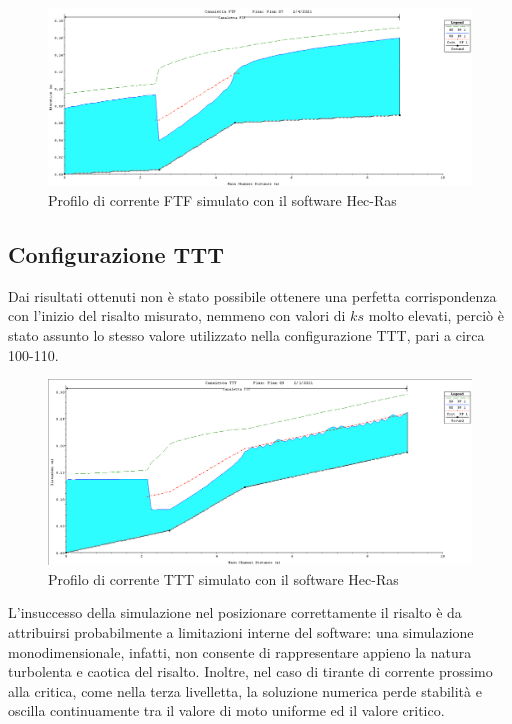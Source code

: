 \documentclass[12pt]{article} %
\begin{document}
\begin{figure}[H]
    \centering
    \includegraphics[scale=0.3]{Profilo HEC-RAS FTF.png}
    \caption{Profilo di corrente FTF simulato con il software Hec-Ras}
\end{figure}


\subsection{Configurazione TTT}

\noindent  Dai risultati ottenuti non è stato possibile ottenere una perfetta corrispondenza con l’inizio del risalto misurato, nemmeno con valori di $ks$ molto elevati, perciò è stato assunto lo stesso valore utilizzato nella configurazione TTT, pari a circa 100-110. 

\begin{figure}[H]
    \centering
    \includegraphics[scale=0.3]{Profilo HEC-RAS TTT.png}
    \caption{Profilo di corrente TTT simulato con il software Hec-Ras}

\end{figure}

\noindent L’insuccesso della simulazione nel posizionare correttamente il risalto è da attribuirsi probabilmente a limitazioni interne del software: una simulazione monodimensionale, infatti, non consente di rappresentare appieno la natura turbolenta e caotica del risalto. Inoltre, nel caso di tirante di corrente prossimo alla critica, come nella terza livelletta, la soluzione numerica perde stabilità e oscilla continuamente tra il valore di moto uniforme ed il valore critico.
\end{document}
